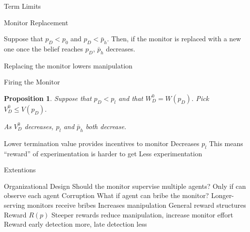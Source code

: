 \documentclass[usenames,dvipsnames]{beamer}
\newcommand{\bo}{\begin{outline}}
\newcommand{\eo}{\end{outline}}
\newtheorem{proposition}{Proposition}
\begin{document}
\begin{frame}{Term Limits}
\begin{center}
\end{center}
\end{frame}


\begin{frame}{Monitor Replacement}
\begin{corollary}
Suppose that $p_D<p_0$ and $p_D<\bar{p}_h$. Then, if the monitor is replaced with a new one once the belief reaches $p_D$, $\bar{p}_h$ decreases.            
\end{corollary}
\bo
\1 Replacing the monitor lowers manipulation
\eo
\end{frame}

\begin{frame}{Firing the Monitor}
\begin{proposition}
        Suppose that $p_{D}<p_{l}$ and that $W_{D}^{0}=W\left( p_{D}\right)$. Pick $%
        V_{D}^{0}\leq V\left( p_{D}\right).$ 
        
        As $V_{D}^{0}$ decreases, $p_{l}$ and $%
        \bar{p}_h$ both decrease.
\end{proposition}
\bo
\1 Lower termination value provides incentives to monitor
\1 Decreases $p_l$
\1 This means ``reward'' of experimentation is harder to get
\1 Less experimentation
\eo
\end{frame}

\begin{frame}{Extentions}
\bo
\1 Organizational Design
\2 Should the monitor supervise multiple agents?
\2 Only if can observe each agent
\1 Corruption
\2 What if agent can bribe the monitor?
\2 Longer-serving monitors receive bribes
\2 Increases manipulation
\1 General reward structures
\2 Reward $R(p)$
\2 Steeper rewards reduce manipulation, increase monitor effort
\2 Reward early detection more, late detection less
\eo
\end{frame}
\end{document}
